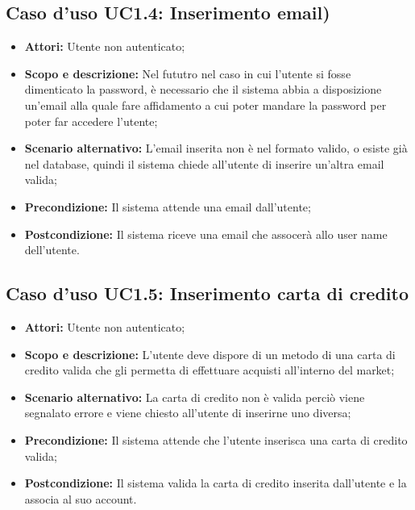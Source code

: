 \documentclass[12pt,a4paper,titlepage]{article}
\begin{document}
\subsection{Caso d'uso UC1.4: Inserimento email)}
\begin{itemize}
	\item \textbf{Attori: }Utente non autenticato;
	\item \textbf{Scopo e descrizione: }Nel fututro nel caso in cui l'utente si fosse dimenticato la password, è necessario che il sistema abbia a disposizione un'email alla quale fare affidamento a cui poter mandare la password per poter far accedere l'utente;
	\item \textbf{Scenario alternativo: }L'email inserita non è nel formato valido, o esiste già nel database, quindi il sistema chiede all'utente di inserire un'altra email valida;
	\item \textbf{Precondizione: }Il sistema attende una email dall'utente;
	\item \textbf{Postcondizione: }Il sistema riceve una email che assocerà allo user name dell'utente.
\end{itemize}
\subsection{Caso d'uso UC1.5: Inserimento carta di credito}
\begin{itemize}
	\item \textbf{Attori: }Utente non autenticato;
	\item \textbf{Scopo e descrizione: }L'utente deve dispore di un metodo di una carta di credito valida che gli permetta di effettuare acquisti all'interno del market;
	\item \textbf{Scenario alternativo: }La carta di credito non è valida perciò viene segnalato errore e viene chiesto all'utente di inserirne uno diversa;
	\item \textbf{Precondizione: }Il sistema attende che l'utente inserisca una carta di credito valida;
	\item \textbf{Postcondizione: }Il sistema valida la carta di credito inserita dall'utente e la associa al suo account.
\end{itemize}
\end{document}
